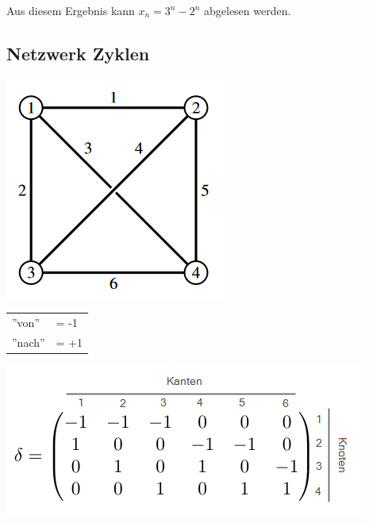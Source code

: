 \noindent Aus diesem Ergebnis kann $x_n =  3^n - 2^n$ abgelesen werden.
\subsection{Netzwerk Zyklen}
\begin{center}
	\begin{minipage}{0.15\textwidth}
		\includegraphics[width=\linewidth,keepaspectratio=true]{./Images/netzwerkzyklus.png}
	\end{minipage}%
	\begin{minipage}{0.3\textwidth}
		\begin{tabular}{ll}
			''von'' &= -1\\
			''nach'' &= +1
		\end{tabular}

		\includegraphics[width=\columnwidth]{./Images/netzwerkzyklus_matrix.png}
	\end{minipage}
\end{center}

